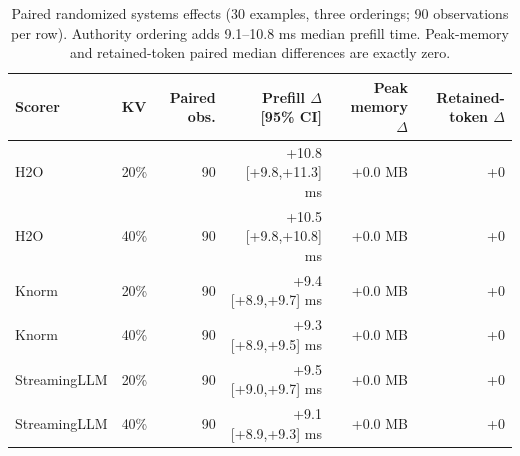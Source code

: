 \begin{table}[t]
\centering
\small
\setlength{\tabcolsep}{4.0pt}
\begin{tabular}{llrrrr}
\toprule
Scorer & KV & Paired obs. & Prefill $\Delta$ [95\% CI] & Peak memory $\Delta$ & Retained-token $\Delta$ \\
\midrule
H2O & 20\% & 90 & +10.8 [+9.8,+11.3] ms & +0.0 MB & +0 \\
H2O & 40\% & 90 & +10.5 [+9.8,+10.8] ms & +0.0 MB & +0 \\
Knorm & 20\% & 90 & +9.4 [+8.9,+9.7] ms & +0.0 MB & +0 \\
Knorm & 40\% & 90 & +9.3 [+8.9,+9.5] ms & +0.0 MB & +0 \\
StreamingLLM & 20\% & 90 & +9.5 [+9.0,+9.7] ms & +0.0 MB & +0 \\
StreamingLLM & 40\% & 90 & +9.1 [+8.9,+9.3] ms & +0.0 MB & +0 \\
\bottomrule
\end{tabular}
\caption{Paired randomized systems effects (30 examples, three orderings; 90 observations per row). Authority ordering adds 9.1--10.8 ms median prefill time. Peak-memory and retained-token paired median differences are exactly zero.}
\label{tab:systems}
\end{table}
